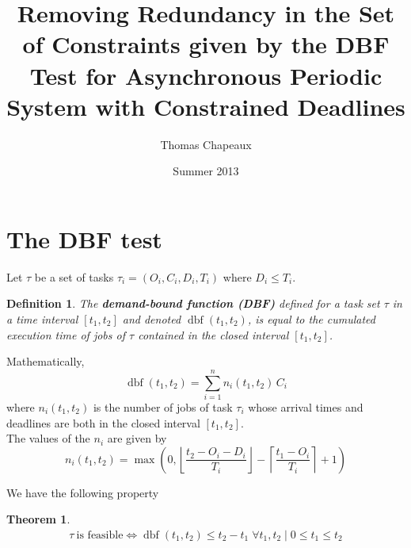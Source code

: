 \documentclass[a4paper,10pt]{article}
\title{Removing Redundancy in the Set of Constraints given by the DBF Test for Asynchronous Periodic System with Constrained Deadlines}
\author{Thomas Chapeaux}
\date{Summer 2013}
\newtheorem{theorem}{Theorem}
\newtheorem{definition}{Definition}
\newcommand{\dbf}[1]{\operatorname{dbf}(#1)}
\begin{document}
\maketitle

\tableofcontents




\newpage

\section{The DBF test}

Let $\tau$ be a set of tasks $\tau_i = (O_i, C_i, D_i, T_i)$ where $D_i \leqslant T_i$.

\begin{definition}
    The \textbf{demand-bound function (DBF)}
    defined for a task set $\tau$ in a time interval $[t_1, t_2]$ and denoted $\dbf{t_1, t_2}$, is
    equal to the cumulated execution time of jobs of $\tau$ contained in the
    closed interval $[t_1, t_2]$.
\end{definition}

Mathematically,
\begin{equation}
    \dbf{t_1, t_2} = \sum_{i=1}^{n} n_i(t_1, t_2) \, C_i
\end{equation}
where $n_i(t_1, t_2)$ is the number of jobs of task $\tau_i$ whose arrival times
and deadlines are both in the closed interval $[t_1, t_2]$.\\

The values of the $n_i$ are given by
\begin{equation}
    n_i(t_1, t_2) = \max
    \left( 0,
        \left\lfloor
            \frac{t_2 - O_i - D_i}{T_i}
        \right\rfloor -
        \left\lceil
            \frac{t_1 - O_i}{T_i}
        \right\rceil + 1
    \right)
\end{equation}

We have the following property

\begin{theorem}
    \label{theo:DBFtest}
    \begin{equation*}
        \begin{array}{c}
            \tau \: \text{is feasible}  \iff
            \dbf{t_1, t_2} \leqslant t_2 - t_1 \; \forall t_1, t_2 \mid  0 \leq t_1 \leq t_2
        \end{array}
    \end{equation*}
\end{theorem}
\end{document}
